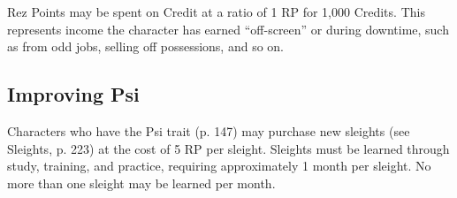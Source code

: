 Rez Points may be spent on Credit at a ratio of 1 RP for 1,000 Credits. This represents income the character has earned “off-screen” or during downtime, such as from odd jobs, selling off possessions, and so on. 

\subsection{Improving Psi} \label{sec:improving-psi} 

Characters who have the Psi trait (p. 147) may purchase new sleights (see Sleights, p. 223) at the cost of 5 RP per sleight. Sleights must be learned through study, training, and practice, requiring approximately 1 month per sleight. No more than one sleight may be learned per month. 







